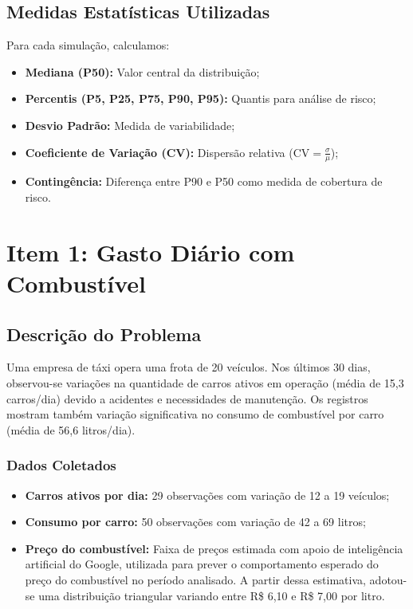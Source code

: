 \documentclass[12pt,a4paper]{article}
\begin{document}
\subsection{Medidas Estatísticas Utilizadas}

Para cada simulação, calculamos:

\begin{itemize}
    \item \textbf{Mediana (P50):} Valor central da distribuição;
    \item \textbf{Percentis (P5, P25, P75, P90, P95):} Quantis para análise de risco;
    \item \textbf{Desvio Padrão:} Medida de variabilidade;
    \item \textbf{Coeficiente de Variação (CV):} Dispersão relativa ($\text{CV} = \frac{\sigma}{\mu}$);
    \item \textbf{Contingência:} Diferença entre P90 e P50 como medida de cobertura de risco.
\end{itemize}

\newpage

\section{Item 1: Gasto Diário com Combustível}

\subsection{Descrição do Problema}

Uma empresa de táxi opera uma frota de 20 veículos. Nos últimos 30 dias, observou-se variações na quantidade de carros ativos em operação (média de 15,3 carros/dia) devido a acidentes e necessidades de manutenção. Os registros mostram também variação significativa no consumo de combustível por carro (média de 56,6 litros/dia).

\subsubsection{Dados Coletados}

\begin{itemize}
    \item \textbf{Carros ativos por dia:} 29 observações com variação de 12 a 19 veículos;
    \item \textbf{Consumo por carro:} 50 observações com variação de 42 a 69 litros;
    \item \textbf{Preço do combustível:} Faixa de preços estimada com apoio de inteligência artificial do Google, utilizada para prever o comportamento esperado do preço do combustível no período analisado. A partir dessa estimativa, adotou-se uma distribuição triangular variando entre R\$ 6,10 e R\$ 7,00 por litro.
\end{itemize}
\end{document}
